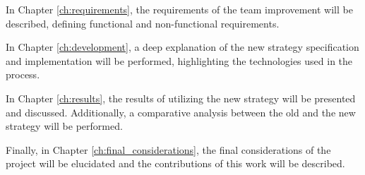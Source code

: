 In Chapter \ref{ch:requirements}, the requirements of the team improvement will be described, defining functional and non-functional requirements.

In Chapter \ref{ch:development}, a deep explanation of the new strategy specification and implementation will be performed, highlighting the technologies used in the process.

In Chapter \ref{ch:results}, the results of utilizing the new strategy will be presented and discussed. Additionally, a comparative analysis between the old and the new strategy will be performed.

Finally, in Chapter \ref{ch:final_considerations}, the final considerations of the project will be elucidated and the contributions of this work will be described.
